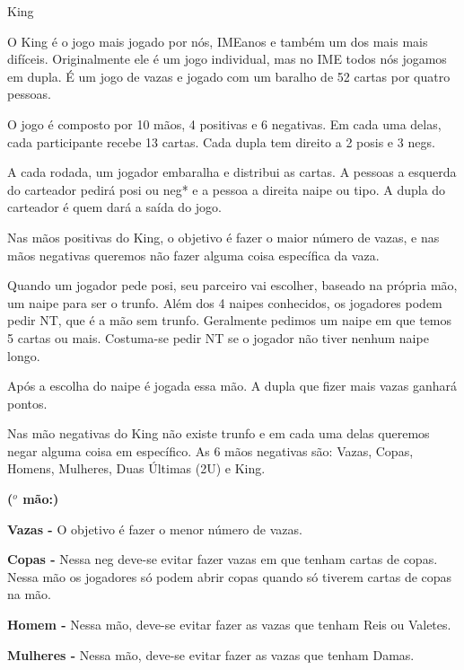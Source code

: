 \begin{subsecao}{King}

O King é o jogo mais jogado por nós, IMEanos e também um dos mais mais difíceis.
Originalmente ele é um jogo individual, mas no IME todos nós jogamos em
dupla. É um jogo de vazas e jogado com um baralho de 52 cartas por quatro
pessoas.

O jogo é composto por 10 mãos, 4 positivas e 6 negativas. Em cada uma delas,
cada participante recebe 13 cartas. Cada dupla tem direito a 2 posis e 3 negs.

A cada rodada, um jogador embaralha e distribui as cartas. A pessoas a esquerda
do carteador pedirá posi ou neg* e a pessoa a direita naipe ou tipo. A dupla do
carteador é quem dará a saída do jogo.

Nas mãos positivas do King, o objetivo é fazer o maior número de vazas, e nas
mãos negativas queremos não fazer alguma coisa específica da vaza.

Quando um jogador pede posi, seu parceiro vai escolher, baseado na própria mão,
um naipe para ser o trunfo. Além dos 4 naipes conhecidos,  os jogadores podem
pedir NT, que é a mão sem trunfo. Geralmente pedimos um naipe em que temos 5
cartas ou mais. Costuma-se pedir NT se o jogador não tiver nenhum naipe longo.

Após a escolha do naipe é jogada essa mão. A dupla que fizer mais vazas ganhará
pontos.

Nas mão negativas do King não existe trunfo e em cada uma delas queremos negar
alguma coisa em específico. As 6 mãos negativas são: Vazas, Copas, Homens,
Mulheres, Duas Últimas (2U) e King.

\begin{list}{\textbf{ ($^{o}$ mão:)}}{}

\item \textbf{Vazas -} O objetivo é fazer o menor número de vazas.

\item \textbf{Copas -}  Nessa neg deve-se evitar fazer vazas em que tenham
cartas de copas. Nessa mão os jogadores só podem abrir copas quando só tiverem
cartas de copas na mão.

\item \textbf{Homem -} Nessa mão, deve-se evitar fazer as vazas que tenham Reis
ou Valetes.

\item \textbf{Mulheres -} Nessa mão, deve-se evitar fazer as vazas que tenham
Damas.


\end{list}
\end{subsecao}
